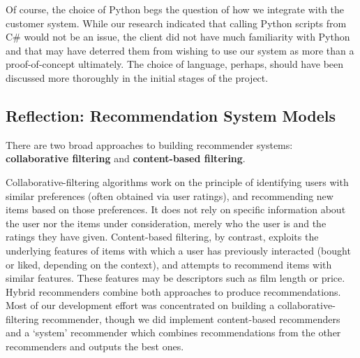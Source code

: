 \documentclass{l3proj}
\begin{document}
Of course, the choice of Python begs the question of how we integrate with the customer system. While our research indicated that calling Python scripts from C\# would not be an issue, the client did not have much familiarity with Python and that may have deterred them from wishing to use our system as more than a proof-of-concept ultimately. The choice of language, perhaps, should have been discussed more thoroughly in the initial stages of the project.


\subsection{Reflection: Recommendation System Models}
\label{sec:modelreflection}

There are two broad approaches to building recommender systems: \textbf{collaborative filtering} and \textbf{content-based filtering}. 

Collaborative-filtering algorithms work on the principle of identifying users with similar preferences (often obtained via user ratings), and recommending new items based on those preferences. It does not rely on specific information about the user nor the items under consideration, merely who the user is and the ratings they have given. Content-based filtering, by contrast, exploits the underlying features of items with which a user has previously interacted (bought or liked, depending on the context), and attempts to recommend items with similar features. These features may be descriptors such as film length or price. Hybrid recommenders combine both approaches to produce recommendations. Most of our development effort was concentrated on building a collaborative-filtering recommender, though we did implement content-based recommenders and a `system' recommender which combines recommendations from the other recommenders and outputs the best ones. 
\end{document}
